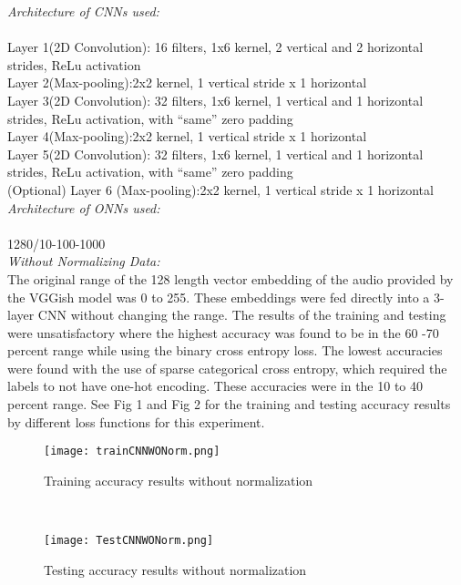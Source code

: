 \documentclass[journal]{IEEEtran}
\begin{document}
\emph {Architecture of CNNs used:}
\\
\\
Layer 1(2D Convolution): 16 filters, 1x6 kernel, 2 vertical and 2 horizontal strides, ReLu activation\\
Layer 2(Max-pooling):2x2 kernel, 1 vertical stride x 1 horizontal\\
Layer 3(2D Convolution): 32 filters, 1x6 kernel, 1 vertical and 1 horizontal strides, ReLu activation, with “same” zero padding\\
Layer 4(Max-pooling):2x2 kernel, 1 vertical stride x 1 horizontal\\
Layer 5(2D Convolution): 32 filters, 1x6 kernel, 1 vertical and 1 horizontal strides, ReLu activation, with “same” zero padding\\
(Optional) Layer 6 (Max-pooling):2x2 kernel, 1 vertical stride x 1 horizontal\\

\emph{Architecture of ONNs used:}
\\
\\
1280/10-100-1000
\\

\emph{Without Normalizing Data:}
\\
The original range of the 128 length vector embedding of the audio provided by the VGGish model was 0 to 255. These embeddings were fed directly into a 3-layer CNN without changing the range. The results of the training and testing were unsatisfactory where the highest accuracy was found to be in the  60 -70 percent range while using the binary cross entropy loss. The lowest accuracies were found with the use of sparse categorical cross entropy, which required the labels to not have one-hot encoding. These accuracies were in the 10 to 40 percent range. See Fig 1 and Fig 2 for the training and testing accuracy results by different loss functions for this experiment.

\begin{figure}[ht]
    \centering
    \texttt{[image: trainCNNWONorm.png]}
    \caption{Training accuracy results without normalization}
    \label{fig:trwo}
\end{figure}


\\

\begin{figure}[ht]
    \centering
    \texttt{[image: TestCNNWONorm.png]}
    \caption{Testing accuracy results without normalization}
    \label{fig:tewo}
\end{figure}
\end{document}
